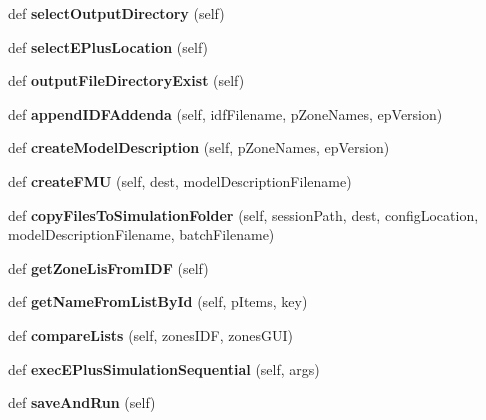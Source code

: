 \begin{DoxyCompactItemize}
\mbox{\label{class_f_run_1_1_frm_run_a3af7bd47020a22de652781d72c19a265}} 
def {\bfseries select\+Output\+Directory} (self)
\item 
\mbox{\label{class_f_run_1_1_frm_run_a31bbf949b1276b347fd0ed52a9fd72ef}} 
def {\bfseries select\+E\+Plus\+Location} (self)
\item 
\mbox{\label{class_f_run_1_1_frm_run_ae9dc8d5977a500391665a3caed784f0f}} 
def {\bfseries output\+File\+Directory\+Exist} (self)
\item 
\mbox{\label{class_f_run_1_1_frm_run_a3547c30d307bd52ff9b243f93b306ed3}} 
def {\bfseries append\+I\+D\+F\+Addenda} (self, idf\+Filename, p\+Zone\+Names, ep\+Version)
\item 
\mbox{\label{class_f_run_1_1_frm_run_a7790f1b9e119c2a171b93bd87222799f}} 
def {\bfseries create\+Model\+Description} (self, p\+Zone\+Names, ep\+Version)
\item 
\mbox{\label{class_f_run_1_1_frm_run_a7170634afdfd97432174a657d775be3c}} 
def {\bfseries create\+F\+MU} (self, dest, model\+Description\+Filename)
\item 
\mbox{\label{class_f_run_1_1_frm_run_a2e67d46dfdc39954a6cd67d45a3b1349}} 
def {\bfseries copy\+Files\+To\+Simulation\+Folder} (self, session\+Path, dest, config\+Location, model\+Description\+Filename, batch\+Filename)
\item 
\mbox{\label{class_f_run_1_1_frm_run_aba02a28f4de8a08e463e224d7d260a9e}} 
def {\bfseries get\+Zone\+Lis\+From\+I\+DF} (self)
\item 
\mbox{\label{class_f_run_1_1_frm_run_a9b84c203fe51281c386f475a604295d4}} 
def {\bfseries get\+Name\+From\+List\+By\+Id} (self, p\+Items, key)
\item 
\mbox{\label{class_f_run_1_1_frm_run_accc62f0981c2fe4ae5d75a5f854d6b03}} 
def {\bfseries compare\+Lists} (self, zones\+I\+DF, zones\+G\+UI)
\item 
\mbox{\label{class_f_run_1_1_frm_run_aa625d1a1dcd18fad236a22e1f4372e15}} 
def {\bfseries exec\+E\+Plus\+Simulation\+Sequential} (self, args)
\item 
\mbox{\label{class_f_run_1_1_frm_run_a418bf87d2fe3e1eeb0a46cebcc7c6512}} 
def {\bfseries save\+And\+Run} (self)
\end{DoxyCompactItemize}



